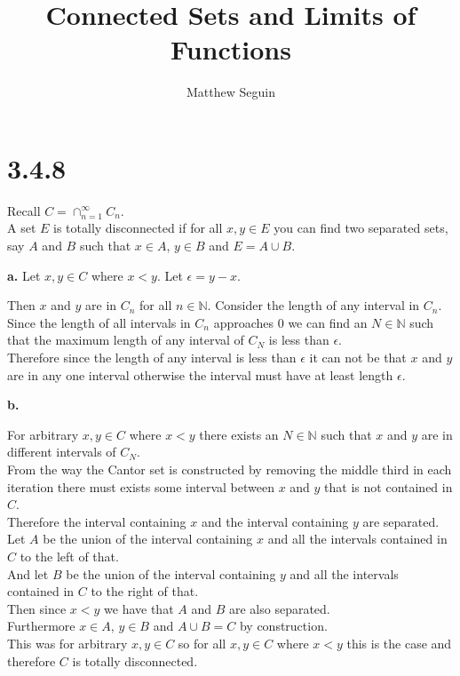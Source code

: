 \documentclass{article}
\title{Connected Sets and Limits of Functions}
\author{Matthew Seguin}
\date{}
\begin{document}
\maketitle

\section*{3.4.8}
\begin{center}
    Recall $C =\cap _{n=1}^{\infty} C_n$.
    \\A set $E$ is totally disconnected if for all $x, y\in E$ you can find two separated sets, say $A$ and $B$ such that $x\in A$, $y\in B$ and $E = A\cup B$.
\end{center}

{\Large \textbf{a.}} Let $x, y\in C$ where $x < y$. Let $\epsilon = y - x$.
\begin{center}
    \doublespacing
    Then $x$ and $y$ are in $C_n$ for all $n\in\mathbb{N}$. Consider the length of any interval in $C_n$.
    \\Since the length of all intervals in $C_n$ approaches $0$ we can find an $N\in\mathbb{N}$ such that the maximum length of any interval of $C_N$ is less than $\epsilon$.
    \\Therefore since the length of any interval is less than $\epsilon$ it can not be that $x$ and $y$ are in any one interval otherwise the interval must have at least length $\epsilon$.
\end{center}

{\Large \textbf{b.}}
\begin{center}
    \doublespacing
    For arbitrary $x, y\in C$ where $x < y$ there exists an $N\in\mathbb{N}$ such that $x$ and $y$ are in different intervals of $C_N$.
    \\From the way the Cantor set is constructed by removing the middle third in each iteration there must exists some interval between $x$ and $y$ that is not contained in $C$.
    \\Therefore the interval containing $x$ and the interval containing $y$ are separated.
    \\Let $A$ be the union of the interval containing $x$ and all the intervals contained in $C$ to the left of that.
    \\And let $B$ be the union of the interval containing $y$ and all the intervals contained in $C$ to the right of that.
    \\Then since $x < y$ we have that $A$ and $B$ are also separated.
    \\Furthermore $x\in A$, $y\in B$ and $A\cup B = C$ by construction.
    \\This was for arbitrary $x, y\in C$ so for all $x, y\in C$ where $x < y$ this is the case and therefore $C$ is totally disconnected.
\end{center}
\end{document}
